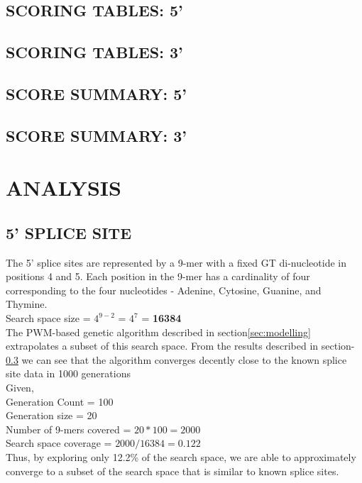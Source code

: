\documentclass[12pt,a4paper]{article}
\begin{document}
	\subsection{SCORING TABLES: 5'}
	
	\subsection{SCORING TABLES: 3'}
	

	\subsection{SCORE SUMMARY: 5'} \label{score5}
	
	
	\subsection{SCORE SUMMARY: 3'} \label{score3}
	
	
	\section{ANALYSIS}
	\subsection{5' SPLICE SITE}
	The 5' splice sites are represented by a 9-mer with a fixed GT di-nucleotide in positions 4 and 5. Each position in the 9-mer has a cardinality of four corresponding to the four nucleotides - Adenine, Cytosine, Guanine, and Thymine. \\
	Search space size = $4^{9-2}$ = $4^7$ = \textbf{16384} \\
	The PWM-based genetic algorithm described in section\ref{sec:modelling} extrapolates a subset of this search space. From the results described in section-\ref{score5} we can see that the algorithm converges decently close to the known splice site data in 1000 generations\\
	Given, \\
	Generation Count = 100 \\
	Generation size = 20 \\
	Number of 9-mers covered = $20 * 100 = 2000 $\\
	Search space coverage = $2000 / 16384 = 0.122$ \\
	Thus, by exploring only 12.2\% of the search space, we are able to approximately converge to a subset of the search space that is similar to known splice sites.
\end{document}
